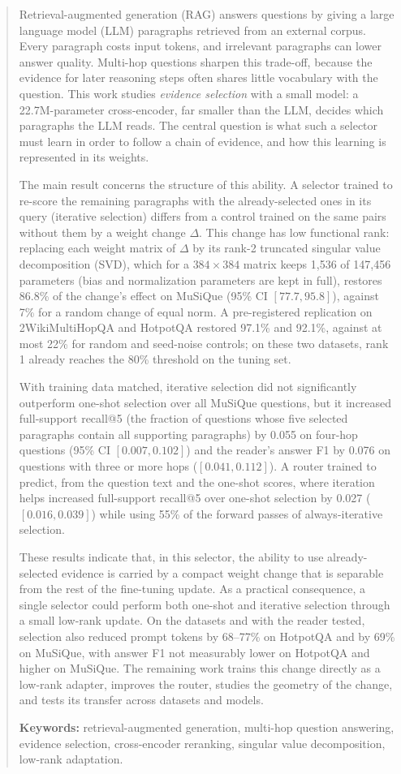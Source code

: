 \begin{abstract}
Retrieval-augmented generation (RAG) answers questions by giving a large language model (LLM) paragraphs retrieved from an external corpus. Every paragraph costs input tokens, and irrelevant paragraphs can lower answer quality. Multi-hop questions sharpen this trade-off, because the evidence for later reasoning steps often shares little vocabulary with the question. This work studies \emph{evidence selection} with a small model: a 22.7M-parameter cross-encoder, far smaller than the LLM, decides which paragraphs the LLM reads. The central question is what such a selector must learn in order to follow a chain of evidence, and how this learning is represented in its weights.

The main result concerns the structure of this ability. A selector trained to re-score the remaining paragraphs with the already-selected ones in its query (iterative selection) differs from a control trained on the same pairs without them by a weight change $\Delta$. This change has low functional rank: replacing each weight matrix of $\Delta$ by its rank-2 truncated singular value decomposition (SVD), which for a $384\times384$ matrix keeps 1,536 of 147,456 parameters (bias and normalization parameters are kept in full), restores 86.8\% of the change's effect on MuSiQue (95\% CI $[77.7, 95.8]$), against 7\% for a random change of equal norm. A pre-registered replication on 2WikiMultiHopQA and HotpotQA restored 97.1\% and 92.1\%, against at most 22\% for random and seed-noise controls; on these two datasets, rank 1 already reaches the 80\% threshold on the tuning set.

With training data matched, iterative selection did not significantly outperform one-shot selection over all MuSiQue questions, but it increased full-support recall@5 (the fraction of questions whose five selected paragraphs contain all supporting paragraphs) by 0.055 on four-hop questions (95\% CI $[0.007, 0.102]$) and the reader's answer F1 by 0.076 on questions with three or more hops ($[0.041, 0.112]$). A router trained to predict, from the question text and the one-shot scores, where iteration helps increased full-support recall@5 over one-shot selection by 0.027 ($[0.016, 0.039]$) while using 55\% of the forward passes of always-iterative selection.

These results indicate that, in this selector, the ability to use already-selected evidence is carried by a compact weight change that is separable from the rest of the fine-tuning update. As a practical consequence, a single selector could perform both one-shot and iterative selection through a small low-rank update. On the datasets and with the reader tested, selection also reduced prompt tokens by 68--77\% on HotpotQA and by 69\% on MuSiQue, with answer F1 not measurably lower on HotpotQA and higher on MuSiQue. The remaining work trains this change directly as a low-rank adapter, improves the router, studies the geometry of the change, and tests its transfer across datasets and models.

\textbf{Keywords:} retrieval-augmented generation, multi-hop question answering, evidence selection, cross-encoder reranking, singular value decomposition, low-rank adaptation.
\end{abstract}
